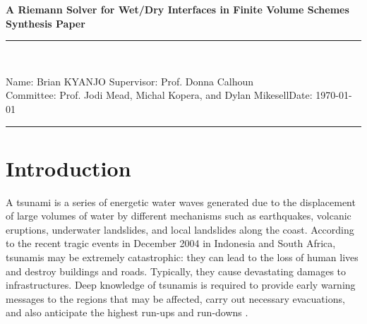 \documentclass[9pt,a4paper]{article}
\newcommand{\student}{Brian KYANJO }
\newcommand{\course}{Prof. Jodi Mead, Michal Kopera, and Dylan Mikesell}
\newcommand{\assignment}{ Prof. Donna Calhoun}
\begin{document}
	
	\thispagestyle{empty}
	\begin{center}
		\textbf{A Riemann Solver for Wet/Dry Interfaces in Finite Volume Schemes\\[0.5cm]
			Synthesis Paper}
		\vspace{.2cm}
	\end{center}
	
	
	\begin{center}
		\rule{17cm}{0.2cm}\\[0.3cm]
	\end{center}	
	
	\noindent	Name: \student \hfill Supervisor: \assignment\\[0.1cm]
	Committee: \course \hfill Date: \today\\
	\rule{17cm}{0.05cm}
	\vspace{.2cm}
	
	\section{Introduction}
	
	A tsunami is a series of energetic water waves generated due to the displacement of large volumes of water by different mechanisms such as earthquakes, volcanic eruptions, underwater landslides, and local landslides along the coast. According to the recent tragic events in December 2004 in Indonesia and  South Africa, tsunamis may be extremely catastrophic: they can lead to the loss of human lives and destroy buildings and roads. Typically, they cause devastating damages to infrastructures. Deep knowledge of tsunamis is required to provide early warning messages to the regions that may be affected, carry out necessary evacuations, and also anticipate the highest run-ups and run-downs  \citep{sanchez2016uncertainty, dutykh2007water,dias2007dynamics}.
	
\end{document}
